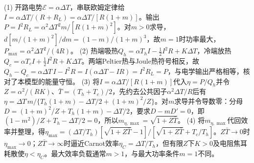 (1) 开路电势\(\mathcal E=\alpha\Delta T\)，串联欧姆定律给\(I=\alpha\Delta T/(R+R_L)=\alpha\Delta T/[R(1+m)]\)。输出\(P=I^2R_L=\alpha^2\Delta T^2 m/[R(1+m)^2]\)。对\(m>0\)求导，\(d[m/(1+m)^2]/dm=(1-m)/(1+m)^3\)，故\(m=1\)时功率最大，\(P_{\max}=\alpha^2\Delta T^2/(4R)\)。
(2) 热端吸热\(Q_h=\alpha T_h I-\tfrac12I^2R+K\Delta T\)，冷端放热\(Q_c=\alpha T_c I+\tfrac12I^2R+K\Delta T\)。两端Peltier热与Joule热符号相反，故\(Q_h-Q_c=\alpha\Delta T\,I-I^2R=I(\alpha\Delta T-IR)=I^2R_L=P\)，与电学输出严格相等，核对了本模型的能量守恒。
(3) 将\(I=\alpha\Delta T/[R(1+m)]\)代入\(\eta=P/Q_h\)并令\(Z=\alpha^2/(RK)\)、\(\bar T=(T_h+T_c)/2\)，先约去公共因子\(\alpha^2\Delta T/R\)后有\(\eta=\Delta T\,m/\{T_h(1+m)-\Delta T/2+(1+m)^2/Z\}\)。对\(m\)求导并令导数零：分母\(D=(1+m)^2/Z+T_h(1+m)-\Delta T/2\)，要求\(D-mD'=0\)，即\((1-m^2)/Z+T_h-\Delta T/2=0\)，所以\(m_{\eta,\max}=\sqrt{1+Z\bar T}\)。
(4) 将\(m_{\eta,\max}\)代回效率并整理，得\(\eta_{\max}=(\Delta T/T_h)[\sqrt{1+Z\bar T}-1]/[\sqrt{1+Z\bar T}+T_c/T_h]\)。\(Z\bar T\to0\)时\(\eta_{\max}\to0\)；\(Z\bar T\to\infty\)时逼近Carnot效率\(\eta_C=\Delta T/T_h\)，但有限\(Z\)下\(K>0\)及电阻焦耳耗散使\(\eta<\eta_C\)。最大效率负载通常\(m>1\)，与最大功率条件\(m=1\)不同。
